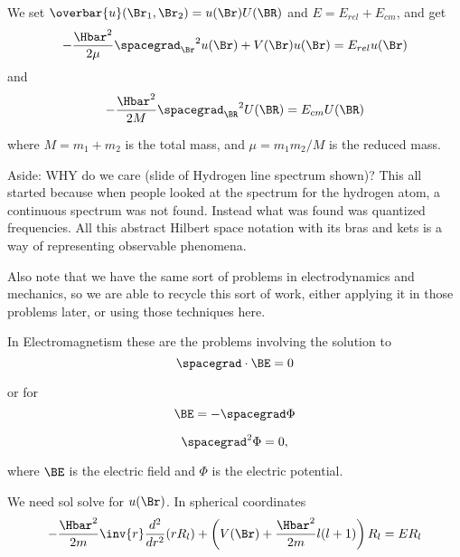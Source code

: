We set \(\overbar{u}(\Br_1, \Br_2) = u(\Br) U(\BR)\) and \(E = E_{rel} + E_{cm}\), and get
%
\begin{equation}\label{eqn:PHY356FLecture10:10}
-\frac{\Hbar^2}{2\mu} {\spacegrad_{\Br}}^2 u(\Br) + V(\Br) u(\Br) = E_{rel} u(\Br)
\end{equation}
and
\begin{equation}\label{eqn:PHY356FLecture10:20}
-\frac{\Hbar^2}{2M} {\spacegrad_{\BR}}^2 U(\BR) = E_{cm} U(\BR)
\end{equation}

where \(M = m_1 + m_2\) is the total mass, and \(\mu = m_1 m_2/M\) is the reduced mass.

Aside: WHY do we care (slide of Hydrogen line spectrum shown)?  This all started because when people looked at the spectrum for the hydrogen atom, a continuous spectrum was not found.  Instead what was found was quantized frequencies.  All this abstract Hilbert space notation with its bras and kets is a way of representing observable phenomena.

Also note that we have the same sort of problems in electrodynamics and mechanics, so we are able to recycle this sort of work, either applying it in those problems later, or using those techniques here.

In Electromagnetism these are the problems involving the solution to
%
\begin{equation}\label{eqn:PHY356FLecture10:30}
\spacegrad \cdot \BE = 0
\end{equation}

or for
\begin{equation}\label{eqn:PHY356FLecture10:40}
\BE = - \spacegrad \Phi
\end{equation}

%
\begin{equation}\label{eqn:PHY356FLecture10:60}
\spacegrad^2 \Phi = 0,
\end{equation}

where \(\BE\) is the electric field and \(\Phi\) is the electric potential.


We need sol solve  for \(u(\Br)\).  In spherical coordinates
%
\begin{equation}\label{eqn:PHY356FLecture10:70}
-\frac{\Hbar^2}{2m} \inv{r} \frac{d^2}{dr^2} ( r R_l ) + \left( V(\Br) + \frac{\Hbar^2 }{2m} l(l+1) \right) R_l = E R_l
\end{equation}

